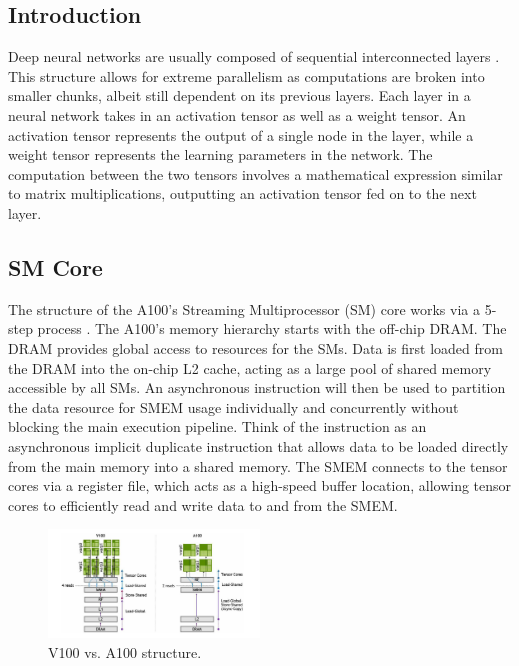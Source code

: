 \subsection{Introduction}
\label{subsec:introduction}
Deep neural networks are usually composed of sequential interconnected layers \cite{b3}.
This structure allows for extreme parallelism as computations are broken into smaller chunks, albeit still dependent on its previous layers.
Each layer in a neural network takes in an activation tensor as well as a weight tensor.
An activation tensor represents the output of a single node in the layer, while a weight tensor represents the learning parameters in the network.
The computation between the two tensors involves a mathematical expression similar to matrix multiplications, outputting an activation tensor fed on to the next layer.

\subsection{SM Core}
\label{subsec:sm-core}
The structure of the A100's Streaming Multiprocessor (SM) core works via a 5-step process \cite{b4}.
The A100's memory hierarchy starts with the off-chip DRAM\@ \cite{b5}.
The DRAM provides global access to resources for the SMs.
Data is first loaded from the DRAM into the on-chip L2 cache, acting as a large pool of shared memory accessible by all SMs.
An asynchronous instruction will then be used to partition the data resource for SMEM usage individually and concurrently without blocking the main execution pipeline.
Think of the instruction as an asynchronous implicit duplicate instruction that allows data to be loaded directly from the main memory into a shared memory.
The SMEM connects to the tensor cores via a register file, which acts as a high-speed buffer location, allowing tensor cores to efficiently read and write data to and from the SMEM\@.

\begin{figure}[htbp!]
    \centerline{\includegraphics[width=0.5\textwidth]{images/gpu_structure}}
    \caption{V100 vs. A100 structure.}
    \label{fig:v100a100struct}
\end{figure}

